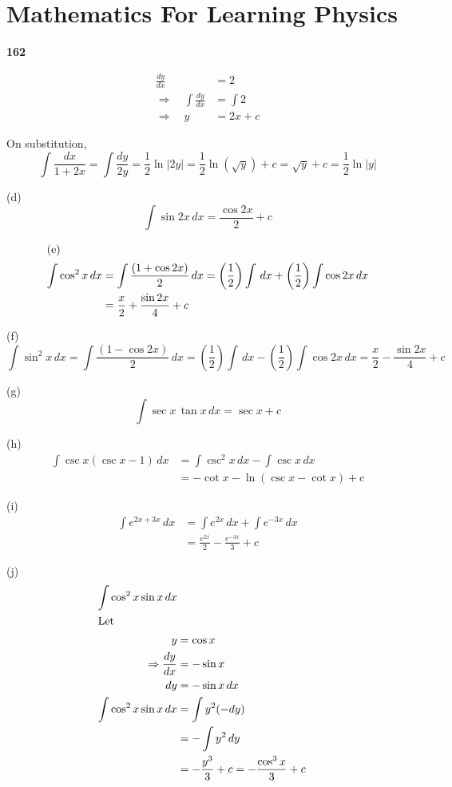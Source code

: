 \documentclass{article}
\begin{document}
\section*{Mathematics For Learning Physics}

\textbf{162}

\[
\begin{aligned}
    \frac{dy}{dx} &= 2 \\
    \Rightarrow \quad \int \frac{dy}{dx} &= \int 2 \\
    \Rightarrow \quad y &= 2x + c
\end{aligned}
\]

On substitution,
\[
\int \frac{dx}{1 + 2x} = \int \frac{dy}{2y} = \frac{1}{2} \ln|2y| = \frac{1}{2} \ln (\sqrt{y}) + c = \sqrt{y} + c = \frac{1}{2} \ln |y|
\]

(d)
\[
\int \sin 2x \, dx = \frac{\cos 2x}{2} + c
\]

\[
\begin{aligned}
\intertext{(e)}
\int \cos^2 x \, dx &= \int \frac{(1 + \cos 2x)}{2} \, dx = \left( \frac{1}{2} \right) \int \, dx + \left( \frac{1}{2} \right) \int \cos 2x \, dx \\
&= \frac{x}{2} + \frac{\sin 2x}{4} + c
\end{aligned}
\]

(f)
\[
\int \sin^2 x \, dx = \int \frac{(1 - \cos 2x)}{2} \, dx = \left( \frac{1}{2} \right) \int \, dx - \left( \frac{1}{2} \right) \int \cos 2x \, dx = \frac{x}{2} - \frac{\sin 2x}{4} + c
\]

(g)
\[
\int \sec x \, \tan x \, dx = \sec x + c
\]

(h)
\[
\begin{aligned}
    \int \csc x (\csc x - 1) \, dx &= \int \csc^2 x \, dx - \int \csc x \, dx \\
    &= -\cot x - \ln (\csc x - \cot x) + c
\end{aligned}
\]

(i)
\[
\begin{aligned}
    \int e^{2x + 3x} \, dx &= \int e^{2x} \, dx + \int e^{-3x} \, dx \\
    &= \frac{e^{2x}}{2} - \frac{e^{-3x}}{3} + c
\end{aligned}
\]

(j)
\[
\begin{aligned}
    \int \cos^2 x \sin x \, dx \\
    \intertext{Let}
    y &= \cos x \\
    \Rightarrow \frac{dy}{dx} &= -\sin x \\
    dy &= -\sin x \, dx \\
    \int \cos^2 x \sin x \, dx &= \int y^2 (-dy) \\
    &= -\int y^2 \, dy \\
    &= -\frac{y^3}{3} + c = -\frac{\cos^3 x}{3} + c
\end{aligned}
\]
\end{document}
